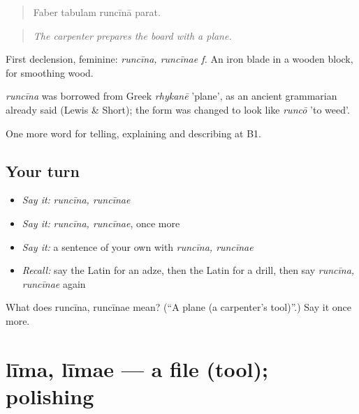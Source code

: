 \begin{quote}
Faber tabulam runcīnā parat.
\end{quote}

\begin{quote}
\emph{The carpenter prepares the board with a plane.}
\end{quote}

First declension, feminine: \emph{runcīna, runcīnae f.} An iron blade in a wooden block, for smoothing wood.

\begin{cousinweb}
\emph{runcīna} was borrowed from Greek \emph{rhykanē} 'plane', as an ancient grammarian already said (Lewis \& Short); the form was changed to look like \emph{runcō} 'to weed'.
\end{cousinweb}

\begin{grammarlens}[title={What you've built}]
One more word for telling, explaining and describing at B1.
\end{grammarlens}

\subsection*{Your turn}
\begin{itemize}
\raggedright
  \item \emph{Say it:} \emph{runcīna, runcīnae}
  \item \emph{Say it:} \emph{runcīna, runcīnae}, once more
  \item \emph{Say it:} a sentence of your own with \emph{runcīna, runcīnae}
  \item \emph{Recall:} say the Latin for an adze, then the Latin for a drill, then say \emph{runcīna, runcīnae} again
\end{itemize}

\begin{tcolorbox}[breakable,colback=teal!4,colframe=teal!35!black,title={Before you move on}]
What does runcīna, runcīnae mean? (\textquotedblleft{}A plane (a carpenter's tool)\textquotedblright{}.) Say it once more.
\end{tcolorbox}
\section[līma, līmae]{līma, līmae — a file (tool); polishing}

\label{lesson:LA-C470-lima}



